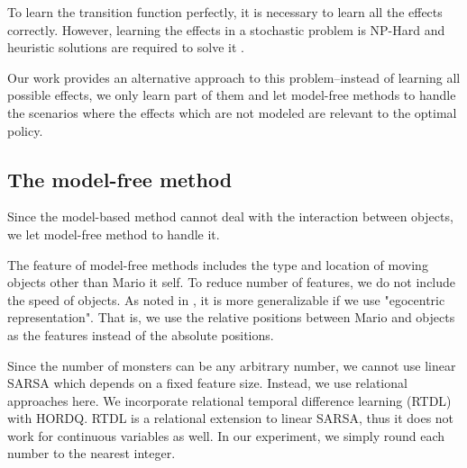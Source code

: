 To learn the transition function perfectly, it is necessary to 
learn all the effects correctly. However, learning the effects in a stochastic
problem is NP-Hard \cite{Walsh09} and heuristic solutions are required
to solve it \cite{Pasula07}.

Our work provides an alternative approach to this problem--instead of learning 
all possible effects, we only learn part of them and 
let model-free methods to handle the scenarios where
the effects which are not modeled are relevant to the optimal policy.






\subsection{The model-free method}

Since the model-based method cannot deal with the interaction between objects, we let
model-free method to handle it.

The feature of model-free methods includes the type and location of moving objects
other than Mario it self. To reduce number of features, we do not include the speed of objects.
As noted in \cite{Gibson09}, it is more generalizable if we use "egocentric representation".
That is, we use the relative positions between Mario and objects 
as the features instead of the absolute positions.

Since the number of monsters can be any arbitrary number, 
we cannot use linear SARSA which depends on a fixed feature size.
Instead, we use relational approaches here. 
We incorporate relational temporal difference learning (RTDL) \cite{RRLTD}
with HORDQ. RTDL is a relational extension to linear SARSA, thus it does not
work for continuous variables as well. In our experiment, we simply
round each number to the nearest integer. 

